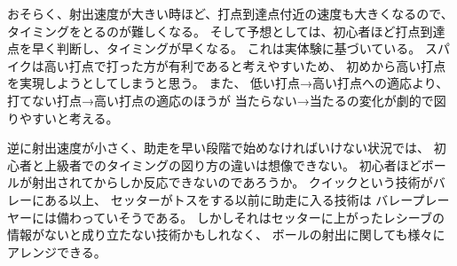 \documentclass[a4paper,11pt]{jsarticle}
\begin{document}
おそらく、射出速度が大きい時ほど、打点到達点付近の速度も大きくなるので、
タイミングをとるのが難しくなる。
そして予想としては、初心者ほど打点到達点を早く判断し、タイミングが早くなる。
これは実体験に基づいている。
スパイクは高い打点で打った方が有利であると考えやすいため、
初めから高い打点を実現しようとしてしまうと思う。
また、
低い打点→高い打点への適応より、打てない打点→高い打点の適応のほうが
当たらない→当たるの変化が劇的で図りやすいと考える。

逆に射出速度が小さく、助走を早い段階で始めなければいけない状況では、
初心者と上級者でのタイミングの図り方の違いは想像できない。
初心者ほどボールが射出されてからしか反応できないのであろうか。
クイックという技術がバレーにある以上、
セッターがトスをする以前に助走に入る技術は
バレープレーヤーには備わっていそうである。
しかしそれはセッターに上がったレシーブの情報がないと成り立たない技術かもしれなく、
ボールの射出に関しても様々にアレンジできる。
\end{document}
